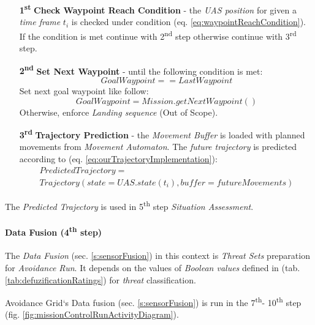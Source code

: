 \begin{itemize}
    \item[\textbf{1\textsuperscript{st}}] \textbf{Check Waypoint Reach Condition} - the \emph{UAS position} for given a \emph{time frame} $t_i$ is checked under condition (eq. \ref{eq:waypointReachCondition}).  If the condition is met continue with 2\textsuperscript{nd} step otherwise continue with 3\textsuperscript{rd} step.

    \item[\textbf{2\textsuperscript{nd}}] \textbf{Set Next Waypoint} - until the following condition is met:
    \begin{equation*}
        Goal Waypoint == Last Waypoint    
    \end{equation*}
    Set next goal waypoint like follow:
    \begin{equation*}
        Goal Waypoint = Mission.get Next Waypoint()
    \end{equation*}
    Otherwise, enforce \emph{Landing sequence} (Out of Scope).
        
    \item[\textbf{3\textsuperscript{rd}}] \textbf{Trajectory Prediction} - the \emph{Movement Buffer} is loaded with planned movements from \emph{Movement Automaton}. The \emph{future trajectory} is predicted according to (eq. \ref{eq:ourTrajectoryImplementation}):
    \begin{multline*}
        Predicted Trajectory = \\Trajectory(state=UAS.state(t_i),buffer=future Movements)
    \end{multline*}
\end{itemize}

\noindent The \emph{Predicted Trajectory} is used in 5\textsuperscript{th} step \emph{Situation Assessment}.

\paragraph{Data Fusion (4\textsuperscript{th} step)} The \emph{Data Fusion} (sec. \ref{s:sensorFusion}) in this context is \emph{Threat Sets} preparation for \emph{Avoidance Run}. It depends on the values of \emph{Boolean values} defined in (tab. \ref{tab:defuzificationRatings}) for \emph{threat} classification.

\begin{note}
    Avoidance Grid`s Data fusion (sec. \ref{s:sensorFusion}) is run in the  7\textsuperscript{th}- 10\textsuperscript{th} step (fig. \ref{fig:missionControlRunActivityDiagram}). 
\end{note}

